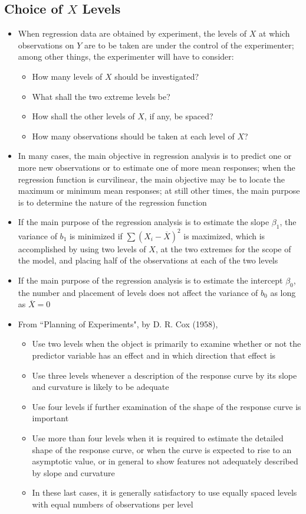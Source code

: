 \subsection{Choice of $X$ Levels}
\begin{itemize} 
\item When regression data are obtained by experiment, the levels of $X$ at which observations on $Y$ are to be taken are under the control of the experimenter; among other things, the experimenter will have to consider: \begin{itemize} 
\item How many levels of $X$ should be investigated? 
\item What shall the two extreme levels be? 
\item How shall the other levels of $X$, if any, be spaced? 
\item How many observations should be taken at each level of $X$? \end{itemize} 
\item In many cases, the main objective in regression analysis is to predict one or more new observations or to estimate one of more mean responses; when the regression function is curvilinear, the main objective may be to locate the maximum or minimum mean responses; at still other times, the main purpose is to determine the nature of the regression function 
\item If the main purpose of the regression analysis is to estimate the slope $\beta_1$, the variance of $b_1$ is minimized if $\sum (X_i - \overline{X})^2$ is maximized, which is accomplished by using two levels of $X$, at the two extremes for the scope of the model, and placing half of the observations at each of the two levels
\item If the main purpose of the regression analysis is to estimate the intercept $\beta_0$, the number and placement of levels does not affect the variance of $b_0$ as long as $\overline{X} = 0$
\item From ``Planning of Experiments", by D. R. Cox (1958), \begin{itemize} 
\item Use two levels when the object is primarily to examine whether or not the predictor variable has an effect and in which direction that effect is 
\item Use three levels whenever a description of the response curve by its slope and curvature is likely to be adequate
\item Use four levels if further examination of the shape of the response curve is important 
\item Use more than four levels when it is required to estimate the detailed shape of the response curve, or when the curve is expected to rise to an asymptotic value, or in general to show features not adequately described by slope and curvature
\item In these last cases, it is generally satisfactory to use equally spaced levels with equal numbers of observations per level \end{itemize} 
\end{itemize} 

